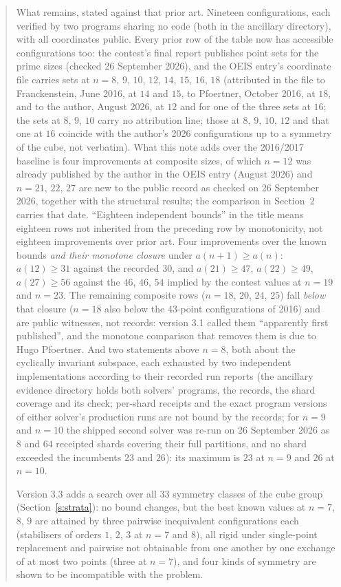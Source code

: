 \documentclass[11pt,a4paper]{article}
\begin{document}
\begin{abstract}
What remains, stated against that prior art.  Nineteen configurations, each verified by two
programs sharing no code (both in the ancillary directory), with all coordinates public.  Every prior row of the table now has
accessible configurations too: the contest's final report publishes point sets for the prime sizes
(checked 26 September 2026), and the OEIS entry's coordinate file carries sets at $n=8$, $9$, $10$, $12$,
$14$, $15$, $16$, $18$ (attributed in the file to Franckenstein, June 2016, at $14$ and $15$, to Pfoertner,
October 2016, at $18$, and to the author, August 2026, at $12$ and for one of the three sets at $16$; the sets at
$8$, $9$, $10$ carry no attribution line; those at $8$, $9$, $10$, $12$ and that one at $16$ coincide with the
author's 2026 configurations up to a symmetry of the cube, not verbatim).  What this note adds over the 2016/2017 baseline is four improvements at composite
sizes, of which $n=12$ was already published by the author in the OEIS entry (August 2026) and $n=21$, $22$, $27$
are new to the public record as checked on 26 September 2026, together with the structural results; the
comparison in Section~2 carries that date.  ``Eighteen independent bounds'' in the title means eighteen rows not inherited from
the preceding row by monotonicity, not eighteen improvements over prior art.  Four improvements over the known bounds \emph{and their monotone
closure} under $a(n+1)\ge a(n)$: $a(12)\ge31$ against the recorded $30$, and $a(21)\ge47$,
$a(22)\ge49$, $a(27)\ge56$ against the $46$, $46$, $54$ implied by the contest values at $n=19$
and $n=23$.  The remaining composite rows ($n=18$, $20$, $24$, $25$) fall \emph{below} that
closure ($n=18$ also below the $43$-point configurations of 2016) and are public witnesses, not records: version 3.1 called them ``apparently first
published'', and the monotone comparison that removes them is due to Hugo Pfoertner.  And two
statements above $n=8$, both about the cyclically invariant subspace, each exhausted by two
independent implementations according to their recorded run reports (the ancillary evidence
directory holds both solvers' programs, the records, the shard coverage and its check; per-shard
receipts and the exact program versions of either solver's production runs are not bound by the
records; for $n=9$ and $n=10$ the shipped second solver was re-run on 26 September 2026 as $8$ and $64$ receipted
shards covering their full partitions, and no shard exceeded the incumbents $23$ and $26$): its maximum is $23$ at $n=9$ and $26$ at $n=10$.

Version 3.3 adds a search over all 33 symmetry classes of the cube group
(Section~\ref{s:strata}): no bound changes, but the best known values at $n=7$, $8$, $9$ are
attained by three pairwise inequivalent configurations each (stabilisers of orders $1$, $2$, $3$
at $n=7$ and $8$), all rigid under single-point replacement and pairwise not obtainable from one
another by one exchange of at most two points (three at $n=7$), and four kinds of
symmetry are shown to be incompatible with the problem.


\end{abstract}
\end{document}
